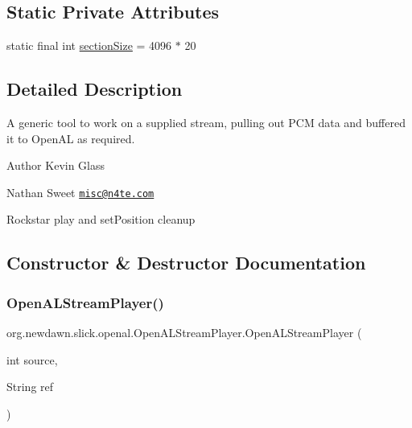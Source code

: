 \subsection*{Static Private Attributes}
\begin{DoxyCompactItemize}
\item 
static final int \mbox{\hyperlink{classorg_1_1newdawn_1_1slick_1_1openal_1_1_open_a_l_stream_player_a15d60c799362a5a58f98c2b4d9eaeeed}{section\+Size}} = 4096 $\ast$ 20
\end{DoxyCompactItemize}


\subsection{Detailed Description}
A generic tool to work on a supplied stream, pulling out P\+CM data and buffered it to Open\+AL as required.

\begin{DoxyAuthor}{Author}
Kevin Glass 

Nathan Sweet \href{mailto:misc@n4te.com}{\tt misc@n4te.\+com} 

Rockstar play and set\+Position cleanup 
\end{DoxyAuthor}


\subsection{Constructor \& Destructor Documentation}
\mbox{\label{classorg_1_1newdawn_1_1slick_1_1openal_1_1_open_a_l_stream_player_af1d0e6ffda79b5da70fb520231954be5}} 
\subsubsection{\texorpdfstring{Open\+A\+L\+Stream\+Player()}{OpenALStreamPlayer()}\hspace{0.1cm}{\footnotesize\ttfamily [1/2]}}
{\footnotesize\ttfamily org.\+newdawn.\+slick.\+openal.\+Open\+A\+L\+Stream\+Player.\+Open\+A\+L\+Stream\+Player (\begin{DoxyParamCaption}\item[{int}]{source,  }\item[{String}]{ref }\end{DoxyParamCaption})\hspace{0.3cm}{\ttfamily [inline]}}

